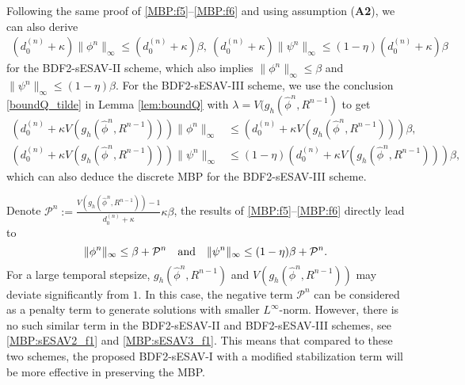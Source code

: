 \documentclass{m2an}
\begin{document}
\begin{rmrk}\label{rem:MBP0} 
	Following the same proof of \eqref{MBP:f5}--\eqref{MBP:f6} and using assumption (\textbf{A2}), we can also derive
	\begin{equation}\label{MBP:sESAV2_f1}
		\begin{aligned}
			( d^{(n)}_{0} + \kappa ) \| \phi^n \|_{\infty} \leq ( d^{(n)}_{0} + \kappa ) \beta, \  ( d^{(n)}_{0} + \kappa ) \| \psi^n \|_{\infty}  \leq (1 - \eta) ( d^{(n)}_{0} + \kappa ) \beta 
		\end{aligned}
	\end{equation}
	for the BDF2-sESAV-II scheme, which also implies $ \| \phi^n \|_{\infty} \leq \beta $ and $ \| \psi^n \|_{\infty} \leq ( 1 - \eta ) \beta $. For the BDF2-sESAV-III scheme, we use the conclusion \eqref{boundQ_tilde} in Lemma \ref{lem:boundQ} with $ \lambda = V( g_h(\hat{\phi}^{n}, R^{n-1}) $ to get
	\begin{equation}\label{MBP:sESAV3_f1}
		\begin{aligned}
			( d^{(n)}_{0} + \kappa V( g_h(\hat{\phi}^{n}, R^{n-1}) ) ) \| \phi^n \|_{\infty} &\leq ( d^{(n)}_{0} + \kappa V( g_h(\hat{\phi}^{n}, R^{n-1}) ) ) \beta, \\
			( d^{(n)}_{0} + \kappa V( g_h(\hat{\phi}^{n}, R^{n-1}) ) ) \| \psi^n \|_{\infty}  &\leq (1 - \eta) ( d^{(n)}_{0} + \kappa V( g_h(\hat{\phi}^{n}, R^{n-1}) ) ) \beta,
		\end{aligned}
	\end{equation}
	which can also deduce the discrete MBP for the BDF2-sESAV-III scheme.
\end{rmrk}

\begin{rmrk}\label{rem:MBP} 
	Denote $ \mathcal{P}^n := \frac{ V( g_h(\hat{\phi}^{n}, R^{n-1}) ) - 1 }{ d^{(n)}_{0} + \kappa } \kappa \beta $, the results of \eqref{MBP:f5}--\eqref{MBP:f6} directly lead to
	\begin{equation*}
		\| \phi^n \|_{\infty} \leq \beta + \mathcal{P}^n \quad  {\rm and} \quad   \| \psi^n \|_{\infty} \leq ( 1 - \eta ) \beta + \mathcal{P}^n.
	\end{equation*}
	For a large temporal stepsize, $ g_h(\hat{\phi}^{n}, R^{n-1}) $ and $ V( g_h(\hat{\phi}^{n}, R^{n-1}) ) $ may deviate significantly from $ 1 $. In this case, the negative term $ \mathcal{P}^n $ can be considered as a penalty term to generate solutions with smaller $L^{\infty}$-norm. However, there is no such similar term in the BDF2-sESAV-II and BDF2-sESAV-III schemes, see \eqref{MBP:sESAV2_f1} and \eqref{MBP:sESAV3_f1}. This means that compared to these two schemes, the proposed BDF2-sESAV-I with a modified stabilization term will be more effective in preserving the MBP.
\end{rmrk}
\end{document}
